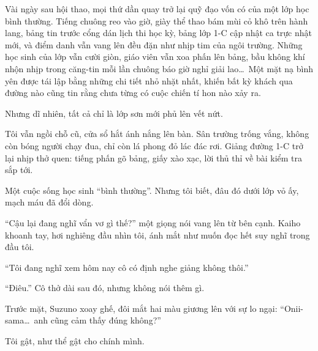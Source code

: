 \documentclass[../main.tex]{subfiles}
\begin{document}


Vài ngày sau hội thao, mọi thứ dần quay trở lại quỹ đạo vốn có của một lớp học bình thường. Tiếng chuông reo vào giờ, giày thể thao bám mùi cỏ khô trên hành lang, bảng tin trước cổng dán lịch thi học kỳ, bảng lớp 1-C cập nhật ca trực nhật mới, và điểm danh vẫn vang lên đều đặn như nhịp tim của ngôi trường. Những học sinh của lớp vẫn cười giòn, giáo viên vẫn xoa phấn lên bảng, bầu không khí nhộn nhịp trong căng-tin mỗi lần chuông báo giờ nghỉ giải lao\dots\ Một mặt nạ bình yên được tái lập bằng những chi tiết nhỏ nhặt nhất, khiến bất kỳ khách qua đường nào cũng tin rằng chưa từng có cuộc chiến tí hon nào xảy ra.

Nhưng dĩ nhiên, tất cả chỉ là lớp sơn mới phủ lên vết nứt.

Tôi vẫn ngồi chỗ cũ, cửa sổ hắt ánh nắng lên bàn. Sân trường trống vắng, không còn bóng người chạy đua, chỉ còn lá phong đỏ lác đác rơi. Giảng đường 1-C trở lại nhịp thở quen: tiếng phấn gõ bảng, giấy xào xạc, lời thủ thỉ về bài kiểm tra sắp tới.

Một cuộc sống học sinh ``bình thường''. Nhưng tôi biết, đâu đó dưới lớp vỏ ấy, mạch máu đã đổi dòng.

``Cậu lại đang nghĩ vẩn vơ gì thế?'' một giọng nói vang lên từ bên cạnh. Kaiho khoanh tay, hơi nghiêng đầu nhìn tôi, ánh mắt như muốn đọc hết suy nghĩ trong đầu tôi.

``Tôi đang nghĩ xem hôm nay cô có định nghe giảng không thôi.''

``Điêu.'' Cô thở dài sau đó, nhưng không nói thêm gì.

Trước mặt, Suzuno xoay ghế, đôi mắt hai màu giương lên với sự lo ngại: ``Onii-sama\dots\ anh cũng cảm thấy đúng không?''

Tôi gật, như thể gật cho chính mình.
\end{document}
